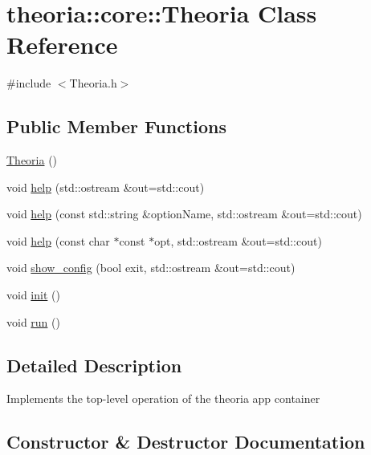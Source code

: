\hypertarget{classtheoria_1_1core_1_1Theoria}{}\section{theoria\+:\+:core\+:\+:Theoria Class Reference}
\label{classtheoria_1_1core_1_1Theoria}


{\ttfamily \#include $<$Theoria.\+h$>$}

\subsection*{Public Member Functions}
\begin{DoxyCompactItemize}
\item 
\hyperlink{classtheoria_1_1core_1_1Theoria_a9a99e8952d6224eade9318098221d144}{Theoria} ()
\item 
void \hyperlink{classtheoria_1_1core_1_1Theoria_aff22e3f956bf86e02fdc53ed491f937d}{help} (std\+::ostream \&out=std\+::cout)
\item 
void \hyperlink{classtheoria_1_1core_1_1Theoria_aad692a4d64908cba9a10ba8453535f83}{help} (const std\+::string \&option\+Name, std\+::ostream \&out=std\+::cout)
\item 
void \hyperlink{classtheoria_1_1core_1_1Theoria_a6e8f92e0bc4cabe69a0675797d158b9f}{help} (const char $\ast$const $\ast$opt, std\+::ostream \&out=std\+::cout)
\item 
void \hyperlink{classtheoria_1_1core_1_1Theoria_aa8290357bebef4260863997d1756f10a}{show\+\_\+config} (bool exit, std\+::ostream \&out=std\+::cout)
\item 
void \hyperlink{classtheoria_1_1core_1_1Theoria_a7c08abec5d2655e8779f81622406ccb7}{init} ()
\item 
void \hyperlink{classtheoria_1_1core_1_1Theoria_a2792aa50eb3ec9a2bea5288097052a3f}{run} ()
\end{DoxyCompactItemize}


\subsection{Detailed Description}
Implements the top-\/level operation of the theoria app container 

\subsection{Constructor \& Destructor Documentation}
\mbox{\label{classtheoria_1_1core_1_1Theoria_a9a99e8952d6224eade9318098221d144}} 
